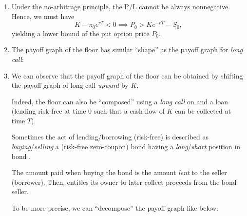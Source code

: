 \begin{enumerate}
\item \label{it:put-price-lb}
Under the no-arbitrage principle, the P/L cannot be always nonnegative. Hence,
we must have
\[
K-\pi_0 e^{rT}<0 \implies P_0>Ke^{-rT}-S_0,
\]
yielding a lower bound of the put option price \(P_0\).
\item The payoff graph of the floor has similar ``shape'' as the payoff graph
for \emph{long call}:
\begin{center}
\end{center}

\item \label{it:floor-lc-lb-payoff}
We can observe that the payoff graph of the floor can be obtained by
shifting the payoff graph of long call \emph{upward} by \(K\).

Indeed, the floor can also be ``composed'' using a \emph{long call} on
 and a loan (lending  risk-free at time
0 such that a cash flow of \(K\) can be collected at time \(T\)).

\begin{note}
Sometimes the act of lending/borrowing  (risk-free) is
described as \emph{buying}/\emph{selling} a (risk-free zero-coupon) bond
  having a \emph{long}/\emph{short} position
in bond .

The amount paid when buying the bond  is the amount \emph{lent}
to the seller (borrower). Then,  entitles its owner to later
collect proceeds from the bond seller.
\end{note}

To be more precise, we can ``decompose'' the payoff graph like below:


\end{enumerate}
